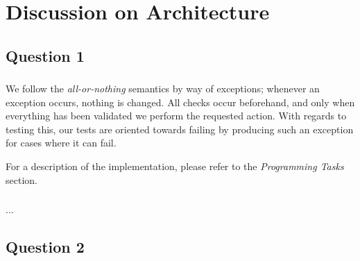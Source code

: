 
\section{Discussion on Architecture}

\subsection{Question 1}

\subsubsection{}
We follow the {\it all-or-nothing} semantics by way of exceptions; whenever an
exception occurs, nothing is changed. All checks occur beforehand, and only when
everything has been validated we perform the requested action. With regards to
testing this, our tests are oriented towards failing by producing such an
exception for cases where it can fail.

For a description of the implementation, please refer to the {\it Programming
Tasks} section.

\subsubsection{}
...

\subsection{Question 2}

